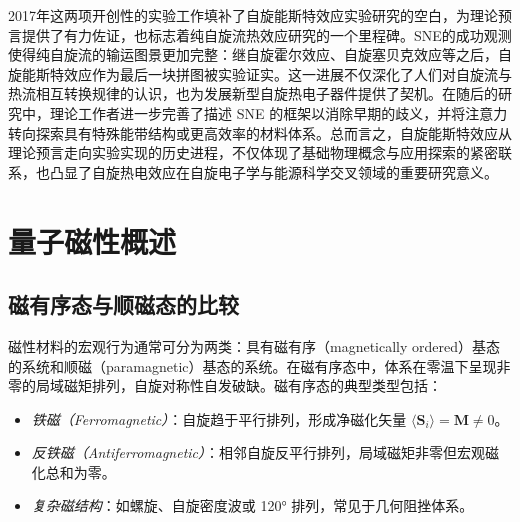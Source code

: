 2017年这两项开创性的实验工作填补了自旋能斯特效应实验研究的空白，为理论预言提供了有力佐证，也标志着纯自旋流热效应研究的一个里程碑。SNE的成功观测使得纯自旋流的输运图景更加完整：继自旋霍尔效应、自旋塞贝克效应等之后，自旋能斯特效应作为最后一块拼图被实验证实。这一进展不仅深化了人们对自旋流与热流相互转换规律的认识，也为发展新型自旋热电子器件提供了契机。在随后的研究中，理论工作者进一步完善了描述 SNE 的框架以消除早期的歧义，并将注意力转向探索具有特殊能带结构或更高效率的材料体系。总而言之，自旋能斯特效应从理论预言走向实验实现的历史进程，不仅体现了基础物理概念与应用探索的紧密联系，也凸显了自旋热电效应在自旋电子学与能源科学交叉领域的重要研究意义。


\section{量子磁性概述}\label{sec:quantum_magnetism}
\subsection{磁有序态与顺磁态的比较}

磁性材料的宏观行为通常可分为两类：具有磁有序（magnetically ordered）基态的系统和顺磁（paramagnetic）基态的系统。在磁有序态中，体系在零温下呈现非零的局域磁矩排列，自旋对称性自发破缺。磁有序态的典型类型包括：

\begin{itemize}
    \item \emph{铁磁（Ferromagnetic）}：自旋趋于平行排列，形成净磁化矢量 $\langle \mathbf{S}_i \rangle = \mathbf{M} \neq 0$。
    \item \emph{反铁磁（Antiferromagnetic）}：相邻自旋反平行排列，局域磁矩非零但宏观磁化总和为零。
    \item \emph{复杂磁结构}：如螺旋、自旋密度波或 120° 排列，常见于几何阻挫体系。
\end{itemize}

